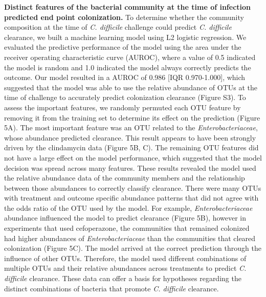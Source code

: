 \documentclass[11pt,]{article}
\begin{document}
\textbf{Distinct features of the bacterial community at the time of
infection predicted end point colonization.} To determine whether the
community composition at the time of \emph{C. difficile} challenge could
predict \emph{C. difficile} clearance, we built a machine learning model
using L2 logistic regression. We evaluated the predictive performance of
the model using the area under the receiver operating characteristic
curve (AUROC), where a value of 0.5 indicated the model is random and
1.0 indicated the model always correctly predicts the outcome. Our model
resulted in a AUROC of 0.986 {[}IQR 0.970-1.000{]}, which suggested that
the model was able to use the relative abundance of OTUs at the time of
challenge to accurately predict colonization clearance (Figure S3). To
assess the important features, we randomly permuted each OTU feature by
removing it from the training set to determine its effect on the
prediction (Figure 5A). The most important feature was an OTU related to
the \emph{Enterobacteriaceae}, whose abundance predicted clearance. This
result appears to have been strongly driven by the clindamycin data
(Figure 5B, C). The remaining OTU features did not have a large effect
on the model performance, which suggested that the model decision was
spread across many features. These results revealed the model used the
relative abundance data of the community members and the relationship
between those abundances to correctly classify clearance. There were
many OTUs with treatment and outcome specific abundance patterns that
did not agree with the odds ratio of the OTU used by the model. For
example, \emph{Enterobacteriaceae} abundance influenced the model to
predict clearance (Figure 5B), however in experiments that used
cefoperazone, the communities that remained colonized had higher
abundances of \emph{Enterobacteriaceae} than the communities that
cleared colonization (Figure 5C). The model arrived at the correct
prediction through the influence of other OTUs. Therefore, the model
used different combinations of multiple OTUs and their relative
abundances across treatments to predict \emph{C. difficile} clearance.
These data can offer a basis for hypotheses regarding the distinct
combinations of bacteria that promote \emph{C. difficile} clearance.
\end{document}
